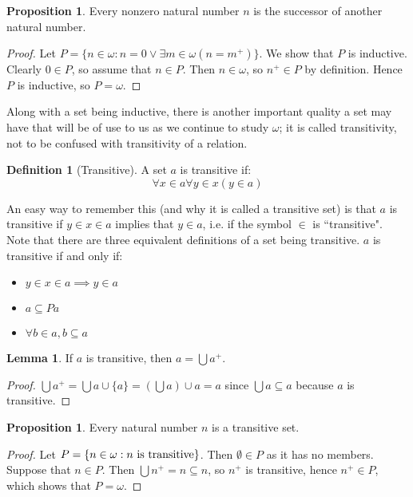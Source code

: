 \documentclass[11pt, oneside]{article}   	%
\theoremstyle{definition}
\newtheorem{definition}{Definition}[section]
\newtheorem{lemma}[theorem]{Lemma}
\newtheorem{prop}[theorem]{Proposition}
\begin{document}
\begin{prop}
	Every nonzero natural number $n$ is the successor of another natural number. 
\end{prop}
\begin{proof}
	Let $P = \{n\in\omega : n = 0\vee\exists m\in\omega (n = m^+)\}$. We show that $P$ is inductive. Clearly $0\in P$, 
	so assume that $n\in P$. Then $n\in\omega$, so $n^+\in P$ by definition. Hence $P$ is inductive, so $P = \omega$.
\end{proof}

Along with a set being inductive, there is another important quality a set may have that will be of use to us as we continue 
to study $\omega$; it is called transitivity, not to be confused with transitivity of a relation.

\begin{definition}[Transitive]
	A set $a$ is transitive if:
	\begin{equation}
		\forall x\in a\forall y\in x (y\in a)
	\end{equation}
\end{definition}

An easy way to remember this (and why it is called a transitive set) is that $a$ is transitive if $y\in x\in a$ implies that 
$y\in a$, i.e. if the symbol $\in$ is ``transitive". Note that there are three equivalent definitions of a set being transitive. 
$a$ is transitive if and only if:
\begin{itemize}
	\item $y\in x\in a\implies y\in a$
	\item $a\subseteq Pa$
	\item $\forall b\in a, b\subseteq a$
\end{itemize}

\begin{lemma}
	If $a$ is transitive, then $a = \bigcup a^+$.
\end{lemma}
\begin{proof}
	$\bigcup a^+ = \bigcup a\cup\{a\} = (\bigcup a)\cup a = a$ since $\bigcup a\subseteq a$ because $a$ is transitive.
\end{proof}

\begin{prop}
	Every natural number $n$ is a transitive set.
\end{prop}
\begin{proof}
	Let $P = \{n\in\omega : n\textnormal{ is transitive}\}$. Then $\emptyset\in P$ as it has no members. Suppose that 
	$n\in P$. Then $\bigcup n^+ = n\subseteq n$, so $n^+$ is transitive, hence $n^+\in P$, which shows that $P = \omega$.
\end{proof}
\end{document}
